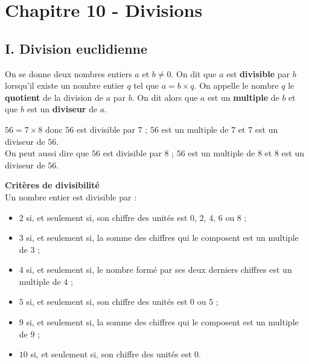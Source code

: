 
\section*{Chapitre 10 - Divisions}

\subsection*{I. Division euclidienne}

\begin{Définition*}
On se donne deux nombres entiers $a$ et $b \neq 0$. On dit que $a$ est \textbf{divisible} par $b$ lorsqu'il existe un nombre entier $q$ tel que $a = b \times q$. On appelle le nombre $q$ le \textbf{quotient} de la division de $a$ par $b$. On dit alors que $a$ est un \textbf{multiple} de $b$ et que $b$ est un \textbf{diviseur} de $a$.
\end{Définition*}

\begin{Exemple}
$56 = 7 \times 8$ donc $56$ est divisible par $7$ ; $56$ est un multiple de $7$ et $7$ est un diviseur de $56$.\\
On peut aussi dire que $56$ est divisible par $8$ ; $56$ est un multiple de $8$ et $8$ est un diviseur de $56$.
\end{Exemple}

\begin{Propriété}[c]\textbf{Critères de divisibilité}\\
Un nombre entier est divisible par :

\begin{itemize}[label=\textcolor{Couleur1}{$\bullet$}]
\item $2$ si, et seulement si, son chiffre des unités est $0$, $2$, $4$, $6$ ou $8$ ;
\item $3$ si, et seulement si, la somme des chiffres qui le composent est un multiple de $3$ ;
\item $4$ si, et seulement si, le nombre formé par ses deux derniers chiffres est un multiple de $4$ ;
\item $5$ si, et seulement si, son chiffre des unités est $0$ ou $5$ ;
\item $9$ si, et seulement si, la somme des chiffres qui le composent est un multiple de $9$ ;
\item $10$ si, et seulement si, son chiffre des unités est $0$.
\end{itemize}
\end{Propriété}

